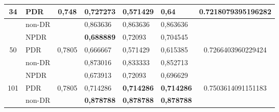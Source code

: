 \begin{table}[hbtp]
\begin{center}
\begin{tabular}{|c|l|c|l|l|l|c|}
			\multirow{-3}{*}{34}  & PDR                                                & \multirow{-3}{*}{0,748}  & 0,727273                                          & 0,571429                                         & 0,64                                            & \multirow{-3}{*}{0.7218079395196282} \\ \hline
			& non-DR                                             &                          & 0,863636                                          & 0,863636                                         & 0,863636                                        &                                      \\ \cline{2-2} \cline{4-6}
			& NPDR                                               &                          & \textbf{0,688889}                                          & 0,72093                                          & 0,704545                                        &                                      \\ \cline{2-2} \cline{4-6}
			\multirow{-3}{*}{50}  & PDR                                                & \multirow{-3}{*}{0,7805} & 0,666667                                          & 0,571429                                         & 0,615385                                        & \multirow{-3}{*}{0.7266403960229424} \\ \hline
			& non-DR                                             &                          & 0,873016                                          & 0,833333                                         & 0,852713                                        &                                      \\ \cline{2-2} \cline{4-6}
			& NPDR                                               &                          & 0,673913                                          & 0,72093                                          & 0,696629                                        &                                      \\ \cline{2-2} \cline{4-6}
			\multirow{-3}{*}{101} & PDR                                                & \multirow{-3}{*}{0,7805} & 0,714286                                          & \textbf{0,714286}                                         & \textbf{0,714286}                                        & \multirow{-3}{*}{0.7503614091151183} \\ \hline
			& non-DR                                             &                          & \textbf{0,878788}                                          & \textbf{0,878788}                                         & \textbf{0,878788}                                        &                                      \\ \cline{2-2} \cline{4-6}

\end{tabular}
\end{center}
\end{table}
